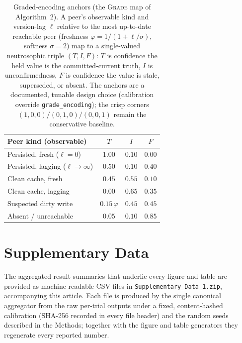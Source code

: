 \documentclass[11pt]{article}
\begin{document}
\begin{table}[t]\centering
\caption{Graded-encoding anchors (the \textsc{Grade} map of Algorithm~2). A peer's
observable kind and version-lag $\ell$ relative to the most up-to-date reachable peer (freshness
$\varphi=1/(1+\ell/\sigma)$, softness $\sigma=2$) map to a single-valued neutrosophic triple $(T,I,F)$:
$T$ is confidence the held value is the committed-current truth, $I$ is unconfirmedness, $F$ is
confidence the value is stale, superseded, or absent. The anchors are a documented, tunable design choice
(calibration override \texttt{grade\_encoding}); the crisp corners $(1,0,0)/(0,1,0)/(0,0,1)$ remain the
conservative baseline.}
\label{tab:grade}
\small
\begin{tabular}{@{}lccc@{}}
\toprule
Peer kind (observable) & $T$ & $I$ & $F$ \\
\midrule
Persisted, fresh ($\ell=0$)          & $1.00$ & $0.10$ & $0.00$ \\
Persisted, lagging ($\ell\to\infty$) & $0.50$ & $0.10$ & $0.40$ \\
Clean cache, fresh                   & $0.45$ & $0.55$ & $0.10$ \\
Clean cache, lagging                 & $0.00$ & $0.65$ & $0.35$ \\
Suspected dirty write                & $0.15\,\varphi$ & $0.45$ & $0.45$ \\
Absent / unreachable                 & $0.05$ & $0.10$ & $0.85$ \\
\bottomrule
\end{tabular}
\end{table}




\clearpage
\section*{Supplementary Data}

The aggregated result summaries that underlie every figure and table are provided as machine-readable
CSV files in \texttt{Supplementary\_Data\_1.zip}, accompanying this article. Each file is produced by
the single canonical aggregator from the raw per-trial outputs under a fixed, content-hashed
calibration (SHA-256 recorded in every file header) and the random seeds described in the Methods;
together with the figure and table generators they regenerate every reported number.
\end{document}
